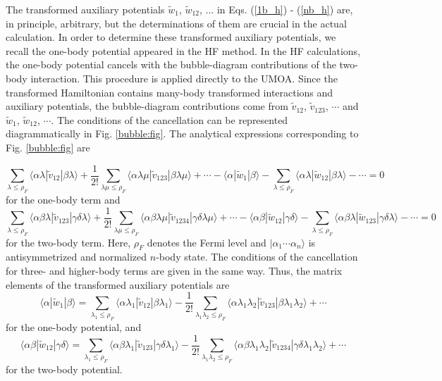 \documentclass[aps,prc, dvips, twocolumn,groupedaddress,showkeys,showpacs,floatfix,superscriptaddress]{revtex4-1}
\newcommand{\<}{\langle}
\renewcommand{\>}{\rangle}
\begin{document}
The transformed auxiliary potentials
 $\widetilde{w}_{1}$, $\widetilde{w}_{12}$,
 $\dots$ in Eqs. (\ref{1b_h}) - (\ref{nb_h}) are, in principle, arbitrary,
 but the determinations of them are crucial in the actual calculation.
In order to determine these transformed auxiliary potentials, we recall
 the one-body potential appeared in the HF method.
In the HF calculations, the one-body potential cancels with the
 bubble-diagram contributions of the two-body interaction.
This procedure is applied directly to the UMOA.
Since the transformed Hamiltonian contains many-body transformed
 interactions and auxiliary potentials, the bubble-diagram contributions come from
 $\widetilde{v}_{12}$, $\widetilde{v}_{123}$, $\cdots$ and
 $\widetilde{w}_{1}$, $\widetilde{w}_{12}$, $\cdots$.
 The conditions of the cancellation can be represented diagrammatically in Fig. \ref{bubble:fig}.
The analytical expressions corresponding to Fig. \ref{bubble:fig} are
\begin{widetext}
\begin{equation}
 \sum_{\lambda\le \rho_{F}}
  \<\alpha\lambda|\widetilde{v}_{12}|\beta\lambda\> + \frac{1}{2!}
  \sum_{\lambda\mu \le \rho_{F}}
  \<\alpha\lambda\mu|\widetilde{v}_{123}|\beta\lambda\mu\> + \cdots
  - \<\alpha|\widetilde{w}_{1}|\beta\> -
\sum_{\lambda\le
 \rho_{F}}\<\alpha\lambda|\widetilde{w}_{12}|\beta\lambda\> - \cdots = 0
\end{equation}
for the one-body term and
\begin{equation}
\sum_{\lambda\le \rho_{F}}
  \<\alpha\beta\lambda|\widetilde{v}_{123}|\gamma\delta\lambda\> + \frac{1}{2!}
  \sum_{\lambda\mu \le \rho_{F}}
  \<\alpha\beta\lambda\mu|\widetilde{v}_{1234}|\gamma\delta\lambda\mu\> + \cdots
- \<\alpha\beta|\widetilde{w}_{12}|\gamma\delta\> -
\sum_{\lambda\le
 \rho_{F}}\<\alpha\beta\lambda|\widetilde{w}_{123}|\gamma\delta\lambda\> - \cdots = 0
\end{equation}
for the two-body term.
Here, $\rho_{F}$ denotes the Fermi level and $|\alpha_{1}\cdots
 \alpha_{n}\>$ is antisymmetrized and normalized $n$-body state.
The conditions of the cancellation for three- and higher-body terms are
 given in the same way.
Thus, the matrix elements of the transformed auxiliary potentials are
 \cite{Suzuki:1988,Suzuki:1992}
\begin{equation}
\label{aux_pot1}
 \<\alpha|\widetilde{w}_{1}|\beta\> = \sum_{\lambda_{1}\le \rho_{F}} \<
  \alpha \lambda_{1}|\widetilde{v}_{12}|\beta\lambda_{1}\> -
  \frac{1}{2!} \sum_{\lambda_{1}\lambda_{2}\le \rho_{F}}
\<\alpha
\lambda_{1}\lambda_{2}|\widetilde{v}_{123}|\beta\lambda_{1}\lambda_{2}\>
+ \cdots
\end{equation}
for the one-body potential, and
\begin{equation}
 \label{aux_pot2}
\<\alpha\beta|\widetilde{w}_{12}|\gamma\delta\> =
\sum_{\lambda_{1}\le \rho_{F}} \<\alpha\beta\lambda_{1}
|\widetilde{v}_{123}|\gamma\delta \lambda_{1}\>
- \frac{1}{2!} \sum_{\lambda_{1}\lambda_{2}\le\rho_{F}}
\<\alpha\beta\lambda_{1}\lambda_{2}|
\widetilde{v}_{1234}|\gamma\delta\lambda_{1}\lambda_{2}\> + \cdots
\end{equation}
for the two-body potential.
\end{widetext}
\end{document}
